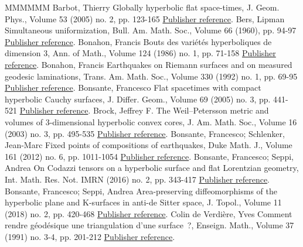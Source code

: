 \begin{thebibliography}{MMMMMM}
 Barbot, Thierry Globally hyperbolic flat space-times, J. Geom. Phys., Volume 53 (2005) no. 2, pp. 123-165 \href{https://ahl.centre-mersenne.org/item/AHL_2020__3__873_0/#barbot}{Publisher reference}.
 Bers, Lipman Simultaneous uniformization, Bull. Am. Math. Soc., Volume 66 (1960), pp. 94-97 \href{https://ahl.centre-mersenne.org/item/AHL_2020__3__873_0/#bers}{Publisher reference}.
 Bonahon, Francis Bouts des variétés hyperboliques de dimension 3, Ann. of Math., Volume 124 (1986) no. 1, pp. 71-158 \href{https://ahl.centre-mersenne.org/item/AHL_2020__3__873_0/#bonahonbouts}{Publisher reference}.
 Bonahon, Francis Earthquakes on Riemann surfaces and on measured geodesic laminations, Trans. Am. Math. Soc., Volume 330 (1992) no. 1, pp. 69-95 \href{https://ahl.centre-mersenne.org/item/AHL_2020__3__873_0/#bonahonearth}{Publisher reference}.
 Bonsante, Francesco Flat spacetimes with compact hyperbolic Cauchy surfaces, J. Differ. Geom., Volume 69 (2005) no. 3, pp. 441-521 \href{https://ahl.centre-mersenne.org/item/AHL_2020__3__873_0/#Bonsante}{Publisher reference}.
 Brock, Jeffrey F. The Weil–Petersson metric and volumes of 3-dimensional hyperbolic convex cores, J. Am. Math. Soc., Volume 16 (2003) no. 3, pp. 495-535 \href{https://ahl.centre-mersenne.org/item/AHL_2020__3__873_0/#BrockWPconvexcore}{Publisher reference}.
 Bonsante, Francesco; Schlenker, Jean-Marc Fixed points of compositions of earthquakes, Duke Math. J., Volume 161 (2012) no. 6, pp. 1011-1054 \href{https://ahl.centre-mersenne.org/item/AHL_2020__3__873_0/#bonschlfixed}{Publisher reference}.
 Bonsante, Francesco; Seppi, Andrea On Codazzi tensors on a hyperbolic surface and flat Lorentzian geometry, Int. Math. Res. Not. IMRN (2016) no. 2, pp. 343-417 \href{https://ahl.centre-mersenne.org/item/AHL_2020__3__873_0/#bonseppicodazzi}{Publisher reference}.
 Bonsante, Francesco; Seppi, Andrea Area-preserving diffeomorphisms of the hyperbolic plane and K-surfaces in anti-de Sitter space, J. Topol., Volume 11 (2018) no. 2, pp. 420-468 \href{https://ahl.centre-mersenne.org/item/AHL_2020__3__873_0/#ksurfaces}{Publisher reference}.
 Colin de Verdière, Yves Comment rendre géodésique une triangulation d’une surface ?, Enseign. Math., Volume 37 (1991) no. 3-4, pp. 201-212 \href{https://ahl.centre-mersenne.org/item/AHL_2020__3__873_0/#cdv}{Publisher reference}.

\end{thebibliography}
